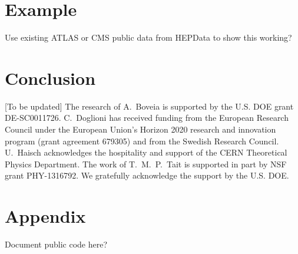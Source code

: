 \documentclass[a4paper, 11pt,notoc]{article}
\begin{document}
\section{Example}

Use existing ATLAS or CMS public data from HEPData to show this working?


\section{Conclusion}



\acknowledgments 

[To be updated] The research of A.~Boveia is supported by the U.S. DOE grant  DE-SC0011726. C.~Doglioni has received funding from the European Research Council under the European Union's Horizon 2020 research and innovation program (grant agreement 679305) and from the Swedish Research Council. U.~Haisch acknowledges the hospitality and support of the CERN Theoretical Physics Department. The work of T.~M.~P.~Tait is supported in part by NSF grant PHY-1316792. We gratefully acknowledge the support by the U.S. DOE. 


\appendix

\section{Appendix}
\label{app:recast}

Document public code here?

\newpage 



\end{document}
